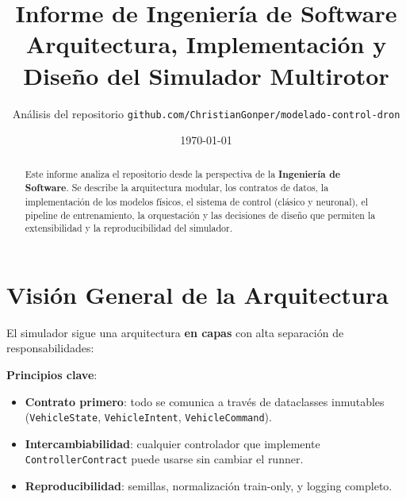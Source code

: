 \documentclass[12pt,a4paper]{article}
\title{\textbf{Informe de Ingeniería de Software}\\[0.3cm]
\large Arquitectura, Implementación y Diseño del Simulador Multirotor}
\author{Análisis del repositorio \texttt{github.com/ChristianGonper/modelado-control-dron}}
\date{\today}
\begin{document}
\maketitle

\begin{abstract}
Este informe analiza el repositorio desde la perspectiva de la \textbf{Ingeniería de Software}. Se describe la arquitectura modular, los contratos de datos, la implementación de los modelos físicos, el sistema de control (clásico y neuronal), 
el pipeline de entrenamiento, la orquestación y las decisiones de diseño que permiten la extensibilidad y la reproducibilidad del simulador.
\end{abstract}

\newpage
\tableofcontents
\newpage

\section{Visión General de la Arquitectura}

El simulador sigue una arquitectura \textbf{en capas} con alta separación de responsabilidades:

\begin{center}
\end{center}

\textbf{Principios clave}:
\begin{itemize}
    \item \textbf{Contrato primero}: todo se comunica a través de dataclasses inmutables (\texttt{VehicleState}, \texttt{VehicleIntent}, \texttt{VehicleCommand}).
    \item \textbf{Intercambiabilidad}: cualquier controlador que implemente \texttt{ControllerContract} puede usarse sin cambiar el runner.
    \item \textbf{Reproducibilidad}: semillas, normalización train-only, y logging completo.
\end{itemize}
\end{document}
